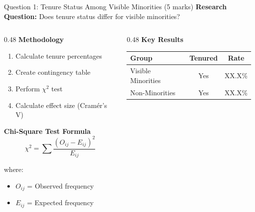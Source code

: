 \documentclass[aspectratio=169]{beamer}
\begin{document}
\begin{frame}{Question 1: Tenure Status Among Visible Minorities (5 marks)}
    \textbf{Research Question:} Does tenure status differ for visible minorities?

    \vspace{0.3cm}

    \begin{columns}[T]
        \begin{column}{0.48\textwidth}
            \textbf{Methodology}
            \begin{enumerate}
                \item Calculate tenure percentages
                \item Create contingency table
                \item Perform $\chi^2$ test
                \item Calculate effect size (Cramér's V)
            \end{enumerate}

            \vspace{0.3cm}

            \textbf{Chi-Square Test Formula}
            \[
            \chi^2 = \sum \frac{(O_{ij} - E_{ij})^2}{E_{ij}}
            \]

            where:
            \begin{itemize}
                \item $O_{ij}$ = Observed frequency
                \item $E_{ij}$ = Expected frequency
            \end{itemize}
        \end{column}

        \begin{column}{0.48\textwidth}
            \textbf{Key Results}

            \begin{table}[h]
                \centering
                \scriptsize
                \begin{tabular}{lcc}
                    \toprule
                    \textbf{Group} & \textbf{Tenured} & \textbf{Rate} \\
                    \midrule
                    Visible Minorities & Yes & XX.X\% \\
                    Non-Minorities & Yes & XX.X\% \\
                    \bottomrule
                \end{tabular}
            \end{table}


\end{column}
\end{columns}
\end{frame}
\end{document}
